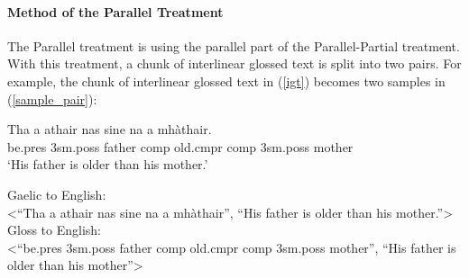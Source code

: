 \documentclass[a4paper]{article}
\begin{document}
\paragraph{Method of the Parallel Treatment}
The Parallel treatment is using the parallel part of the Parallel-Partial treatment. With this treatment, a chunk of interlinear glossed text is split into two pairs. For example, the chunk of interlinear glossed text in (\ref{igt}) becomes two samples in (\ref{sample_pair}): 
\begin{exe} 
\ex \label{igt}
	\gll    Tha a athair nas sine na a mh\`athair.\\  
            be.pres 3sm.poss father comp old.cmpr comp 3sm.poss mother \\
    \glt    `His father is older than his mother.'  
\end{exe}


\begin{exe} 
	\ex \label{sample_pair}
	\begin{xlist}
		\ex Gaelic to English: \\<``Tha a athair nas sine na a mh\`athair'', ``His father is older than his mother.''>
		\ex Gloss to English: \\<``be.pres 3sm.poss father comp old.cmpr comp 3sm.poss mother'', ``His father is older than his mother''>
	\end{xlist}
\end{exe}
\end{document}

